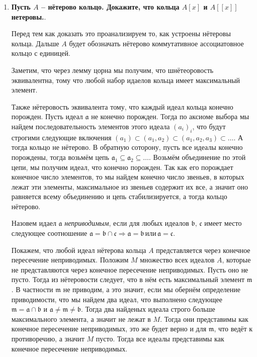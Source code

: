 \documentclass{article}
\begin{document}
\begin{enumerate}
    \item \textbf{Пусть $A$ – нётерово кольцо. Докажите, что кольца $A[x]$ и
        $A[[x]]$ нетеровы.}.

        Перед тем как доказать это проанализируем то, как устроены нётеровы
        кольца. Дальше $A$ будет обозначать нётерово коммутативное ассоциатовное
        кольцо с единицей.

        Заметим, что через лемму цорна мы получим, что шнётеоровость эквивалентна,
        тому что любой набор идаелов кольца имеет максимальный элемент.

        Также нётеровость эквивалента тому, что каждый идеал кольца конечно
        порожден. Пусть идеал $\mathfrak{a}$ не конечно порожден.
        Тогда по аксиоме выбора мы найдем последовательность элементов этого
        идеала $(a_i)_i$, что будут строгими следующие включения $(a_1)\subset
        (a_1,a_2)\subset(a_1,a_2,a_3)\subset\ldots$. А тогда кольцо не нётерово.
        В обратную соторону, пусть все идеалы конечно порождены, тогда возьмём
        цепь $\mathfrak{a}_1\subseteq\mathfrak{a}_2\subseteq\ldots$. Возьмём
        объединение по этой цепи, мы получим идеал, что конечно порожден. Так
        как его порождает конечное число элементов, то мы найдем конечно число
        звеньев, в которых лежат эти элементы, максимальное из звеньев содержит
        их все, а значит оно равняется всему объединению и цепь стабилизируется, 
        а тогда кольцо нётерово.

        Назовем идаел $\mathfrak{a}$ \emph{неприводимым}, если для любых идеалов
        $\mathfrak{b},\,\mathfrak{c}$ имеет место следующее соотношение $\mathfrak{a}
        =\mathfrak{b}\cap\mathfrak{c}\Rightarrow\mathfrak{a}=\mathfrak{b}\,\text{или}
        \,\mathfrak{a}=\mathfrak{c}$.

        Покажем, что любой идеал нётерова кольца $A$ представляется через
        конечное пересечение неприводимых. Положим $M$ множество всех идеалов
        $A$, которые не представляются через конечное пересечение неприводимых.
        Пусть оно не пусто. Тогда из нётеровости следует, что в нём есть
        максимальный элемент $\mathfrak{m}$. В частности $\mathfrak{m}$ не
        приводим, а это значит, если мы обернём определение приводимости,
        что мы найдем два идеал, что выполнено следующее $\mathfrak{m}=\mathfrak{a}
        \cap\mathfrak{b}$ и $\mathfrak{a}\neq\mathfrak{m}\neq\mathfrak{b}$. Тогда
        два найденых идеала строго больше максимального элемента, а значит не
        лежат в $M$. Тогда они представимы как конечное пересечение неприводимых,
        это же будет верно и для $\mathfrak{m}$, что ведёт к противоречию, а
        значит $M$ пусто. Тогда все идеалы представимы как конечное пересечение
        неприводимых.


\end{enumerate}
\end{document}
